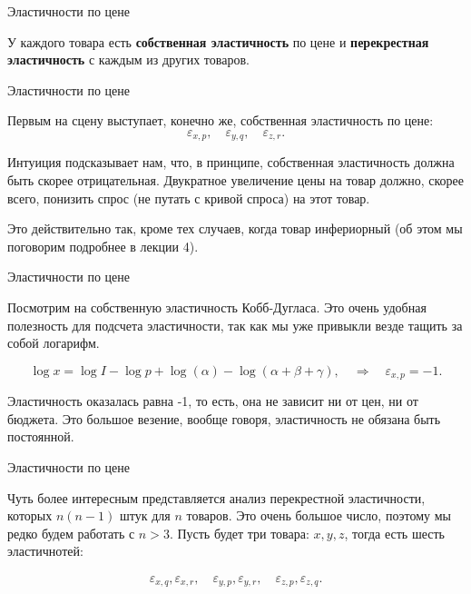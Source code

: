 \documentclass{beamer}
\begin{document}
\begin{frame}{Эластичности по цене}

У каждого товара есть \textbf{собственная эластичность} по цене и \textbf{перекрестная эластичность} с каждым из других товаров. 

\end{frame}

\begin{frame}{Эластичности по цене}

Первым на сцену выступает, конечно же, собственная эластичность по цене:
$$\varepsilon_{x,p}, \quad \varepsilon_{y,q}, \quad \varepsilon_{z,r}.$$

Интуиция подсказывает нам, что, в принципе, собственная эластичность должна быть скорее отрицательная. Двукратное увеличение цены на товар должно, скорее всего, понизить спрос (не путать с кривой спроса) на этот товар. 

Это действительно так, кроме тех случаев, когда товар инфериорный (об этом мы поговорим подробнее в лекции 4).

\end{frame}

\begin{frame}{Эластичности по цене}

Посмотрим на собственную эластичность Кобб-Дугласа. Это очень удобная полезность для подсчета эластичности, так как мы уже привыкли везде тащить за собой логарифм.

$$\log x = \log I - \log p + \log(\alpha) - \log(\alpha + \beta + \gamma), \quad \Rightarrow \quad \varepsilon_{x,p} = -1.$$

Эластичность оказалась равна -1, то есть, она не зависит ни от цен, ни от бюджета. Это большое везение, вообще говоря, эластичность не обязана быть постоянной.

\end{frame}

\begin{frame}{Эластичности по цене}

Чуть более интересным представляется анализ перекрестной эластичности, которых $n(n-1)$ штук для $n$ товаров. Это очень большое число, поэтому мы редко будем работать с $n>3$. Пусть будет три товара: $x,y,z$, тогда есть шесть эластичнотей:

\begin{gather*}
\varepsilon_{x,q}, \varepsilon_{x,r}, \quad \varepsilon_{y,p}, \varepsilon_{y,r}, \quad \varepsilon_{z,p}, \varepsilon_{z,q}.
\end{gather*}

\end{frame}
\end{document}
